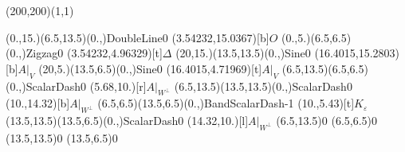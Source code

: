 \unitlength=1bp%

\begin{feynartspicture}(200,200)(1,1)

\FADiagram{}
\FAProp(0.,15.)(6.5,13.5)(0.,){DoubleLine}{0}
\FALabel(3.54232,15.0367)[b]{$O$}
\FAProp(0.,5.)(6.5,6.5)(0.,){Zigzag}{0}
\FALabel(3.54232,4.96329)[t]{$\Delta$}
\FAProp(20,15.)(13.5,13.5)(0.,){Sine}{0}
\FALabel(16.4015,15.2803)[b]{$A|_V$}
\FAProp(20,5.)(13.5,6.5)(0.,){Sine}{0}
\FALabel(16.4015,4.71969)[t]{$A|_V$}
\FAProp(6.5,13.5)(6.5,6.5)(0.,){ScalarDash}{0}
\FALabel(5.68,10.)[r]{$A|_{W^\perp}$}
\FAProp(6.5,13.5)(13.5,13.5)(0.,){ScalarDash}{0}
\FALabel(10.,14.32)[b]{$A|_{W^\perp}$}
\FAProp(6.5,6.5)(13.5,6.5)(0.,){BandScalarDash}{-1}
\FALabel(10.,5.43)[t]{$K_\varepsilon$}
\FAProp(13.5,13.5)(13.5,6.5)(0.,){ScalarDash}{0}
\FALabel(14.32,10.)[l]{$A|_{W^\perp}$}
\FAVert(6.5,13.5){0}
\FAVert(6.5,6.5){0}
\FAVert(13.5,13.5){0}
\FAVert(13.5,6.5){0}
\end{feynartspicture}

